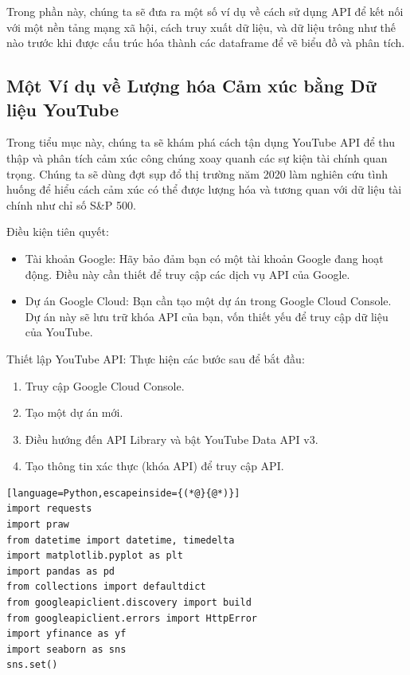 Trong phần này, chúng ta sẽ đưa ra một số ví dụ về cách sử dụng API để kết nối với một nền tảng mạng xã hội, cách truy xuất dữ liệu, và dữ liệu trông như thế nào trước khi được cấu trúc hóa thành các dataframe để vẽ biểu đồ và phân tích.

\subsection{Một Ví dụ về Lượng hóa Cảm xúc bằng Dữ liệu YouTube}

Trong tiểu mục này, chúng ta sẽ khám phá cách tận dụng YouTube API để thu thập và phân tích cảm xúc công chúng xoay quanh các sự kiện tài chính quan trọng. Chúng ta sẽ dùng đợt sụp đổ thị trường năm 2020 làm nghiên cứu tình huống để hiểu cách cảm xúc có thể được lượng hóa và tương quan với dữ liệu tài chính như chỉ số S\&P 500.

Điều kiện tiên quyết:

\begin{itemize}
  \item Tài khoản Google: Hãy bảo đảm bạn có một tài khoản Google đang hoạt động. Điều này cần thiết để truy cập các dịch vụ API của Google.

  \item Dự án Google Cloud: Bạn cần tạo một dự án trong Google Cloud Console. Dự án này sẽ lưu trữ khóa API của bạn, vốn thiết yếu để truy cập dữ liệu của YouTube.
\end{itemize}

Thiết lập YouTube API: Thực hiện các bước sau để bắt đầu:

\begin{enumerate}
  \item Truy cập Google Cloud Console.

  \item Tạo một dự án mới.

  \item Điều hướng đến API Library và bật YouTube Data API v3.

  \item Tạo thông tin xác thực (khóa API) để truy cập API.
\end{enumerate}

\begin{lstlisting}[language=Python,escapeinside={(*@}{@*)}]
import requests
import praw
from datetime import datetime, timedelta
import matplotlib.pyplot as plt
import pandas as pd
from collections import defaultdict
from googleapiclient.discovery import build
from googleapiclient.errors import HttpError
import yfinance as yf
import seaborn as sns
sns.set()
\end{lstlisting}

